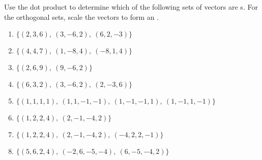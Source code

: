 \begin{exercise} \label{ex:} 
Use the dot product to determine which of the following sets of vectors are s.
For the orthogonal sets, scale the vectors to form an .

\begin{enumerate}
\item \(\{(2,3,6),\ (3,-6,2),\ (6,2,-3)\}\)

\item \(\{(4,4,7),\ (1,-8,4),\ (-8,1,4)\}\)

\item \(\{(2,6,9),\ (9,-6,2)\}\)

\item \(\{(6,3,2),\ (3,-6,2),\ (2,-3,6)\}\)

\item \(\{(1,1,1,1),\ (1,1,-1,-1),\ (1,-1,-1,1),\ (1,-1,1,-1)\}\)

\item \(\{(1,2,2,4),\ (2,-1,-4,2)\}\)

\item \(\{(1,2,2,4),\ (2,-1,-4,2),\ (-4,2,2,-1)\}\)

\item \(\{(5,6,2,4),\ (-2,6,-5,-4),\ (6,-5,-4,2)\}\)

\end{enumerate}
\end{exercise}


